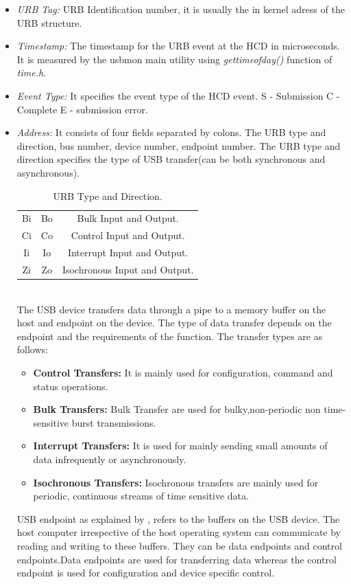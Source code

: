 \begin{itemize}
\item {\textit{URB Tag:} URB Identification number, it is usually the in kernel adress of the URB structure.}
\item{\textit{Timestamp:} The timestamp for the URB event at the HCD in microseconds. It is measured by the usbmon main utility using \textit{gettimeofday()} function of \textit{time.h}.}
\item{\textit{Event Type:} It specifies the event type of the HCD event. S - Submission C -Complete E - submission error.}
\item{\textit{Address: } It consists of four fields separated by colons. The URB type and direction, bus number, device number, endpoint number. The URB type and direction specifies the type of USB transfer(can be both synchronous and asynchronous).\\
\begin{table}[h!]
\centering
\begin{tabular}{|c|c|c|}
\hline
Bi & Bo & Bulk Input and Output.\\
Ci & Co & Control Input and Output.\\
Ii & Io & Interrupt Input and Output.\\
Zi & Zo & Isochronous Input and Output.\\
\hline
\end{tabular}
\caption{URB Type and Direction.}
\end{table}\\
The USB device transfers data through a pipe to a memory buffer on the host and endpoint on the device. The type of data transfer depends on the endpoint and the requirements of the function. The transfer types are as follows\cite{_usb_data_transfer}:

\begin{itemize}
\item{\textbf{Control Transfers:} It is mainly used for configuration, command and status operations.}
\item{\textbf{Bulk Transfers:} Bulk Transfer are used for bulky,non-periodic non time-sensitive burst transmissions.}
\item{\textbf{Interrupt Transfers:} It is used for mainly sending small amounts of data infrequently or asynchronously.}
\item{\textbf{Isochronous Transfers:} Isochronous transfers are mainly used for periodic, continuous streams of time sensitive data.} 
\end{itemize}
USB endpoint as explained by \cite{_usb_endpoint} , refers to the buffers on the USB device. The host computer irrespective of the host operating system can communicate by reading and writing to these buffers. They can be data endpoints and control endpoints.Data endpoints are used for transferring data whereas the control endpoint is used for configuration and device specific control.
}


\end{itemize}
